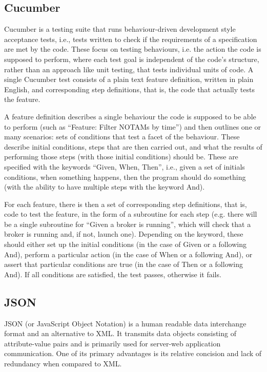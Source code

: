 \documentclass[a4paper, 12pt, twoside]{article}
\begin{document}
\subsection{Cucumber}
\label{sec:bg_cucumber}

Cucumber is a testing suite that runs behaviour-driven development style acceptance tests, i.e., tests written to check if the requirements of a specification are met by the code. These focus on testing behaviours, i.e. the action the code is supposed to perform, where each test goal is independent of the code’s structure, rather than an approach like unit testing, that tests individual units of code.
A single Cucumber test consists of a plain text feature definition, written in plain English, and corresponding step definitions, that is, the code that actually tests the feature.

A feature definition describes a single behaviour the code is supposed to be able to perform (such as ``Feature: Filter NOTAMs by time'') and then outlines one or many scenarios: sets of conditions that test a facet of the behaviour. These describe initial conditions, steps that are then carried out, and what the results of performing those steps (with those initial conditions) should be. These are specified with the keywords ``Given, When, Then'', i.e., given a set of initials conditions, when something happens, then the program should do something (with the ability to have multiple steps with the keyword And).

For each feature, there is then a set of corresponding step definitions, that is, code to test the feature, in the form of a subroutine for each step (e.g. there will be a single subroutine for ``Given a broker is running'', which will check that a broker is running and, if not, launch one). Depending on the keyword, these should either set up the initial conditions (in the case of Given or a following And), perform a particular action (in the case of When or a following And), or assert that particular conditions are true (in the case of Then or a following And). If all conditions are satisfied, the test passes, otherwise it fails.

\subsection{JSON}
\label{sec:bg_json}

JSON (or JavaScript Object Notation) is a human readable data interchange format and an alternative to XML. It transmits data objects consisting of attribute-value pairs and is primarily used for server-web application communication. One of its primary advantages is its relative concision and lack of redundancy when compared to XML.
\end{document}
